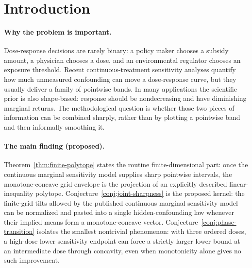 \documentclass[11pt]{article}
\theoremstyle{definition}
\theoremstyle{plain}
\theoremstyle{remark}
\begin{document}
\section{Introduction}
\paragraph{Why the problem is important.}
Dose-response decisions are rarely binary: a policy maker chooses a subsidy amount, a physician chooses a dose, and an environmental regulator chooses an exposure threshold.  Recent continuous-treatment sensitivity analyses quantify how much unmeasured confounding can move a dose-response curve, but they usually deliver a family of pointwise bands.  In many applications the scientific prior is also shape-based: response should be nondecreasing and have diminishing marginal returns.  The methodological question is whether those two pieces of information can be combined sharply, rather than by plotting a pointwise band and then informally smoothing it.

\paragraph{The main finding (proposed).}
Theorem~\ref{thm:finite-polytope} states the routine finite-dimensional part: once the continuous marginal sensitivity model supplies sharp pointwise intervals, the monotone-concave grid envelope is the projection of an explicitly described linear-inequality polytope.  Conjecture~\ref{conj:joint-sharpness} is the proposed kernel: the finite-grid tilts allowed by the published continuous marginal sensitivity model can be normalized and pasted into a single hidden-confounding law whenever their implied means form a monotone-concave vector.  Conjecture~\ref{conj:phase-transition} isolates the smallest nontrivial phenomenon: with three ordered doses, a high-dose lower sensitivity endpoint can force a strictly larger lower bound at an intermediate dose through concavity, even when monotonicity alone gives no such improvement.
\end{document}
